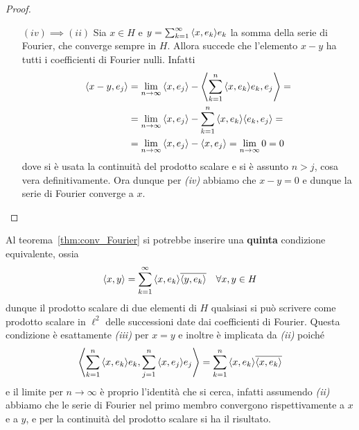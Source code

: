 \begin{proof}
\begin{enumerate}
    \item [\((iv) \implies (ii)\)] Sia \(x \in H\) e \(y = \sum_{k=1}^{\infty} {\left\langle x, e_{k}\right\rangle} e_{k} \)
    la somma della serie di Fourier, che converge sempre in \(H\). Allora
    succede che l'elemento \(x - y\) ha tutti i coefficienti di Fourier nulli.
    Infatti 
    \begin{align*}
        {\left\langle x - y, e_{j}\right\rangle} &= \lim_{n \to \infty} {\left\langle x, e_{j}\right\rangle} -
        {\left\langle\sum_{k=1}^{n} {\left\langle x, e_{k}\right\rangle} e_{k}, e_{j} \right\rangle} = \\ &= \lim_{n \to
        \infty}
      {\left\langle x, e_{j}\right\rangle} - \sum_{k=1}^{n} {\left\langle x, e_{k}\right\rangle} {\left\langle e_{k}, e_{j}\right\rangle} = \\
                            &= \lim_{n \to \infty} {\left\langle x, e_{j}\right\rangle} - {\left\langle x,
                            e_{j}\right\rangle} = \lim_{n \to \infty} 0 = 0
    \end{align*}
    dove si è usata la continuità del prodotto scalare e si è assunto \(n > j\),
    cosa vera definitivamente. Ora dunque per \textit{(iv)} abbiamo che \(x - y
    = 0\) e dunque la serie di Fourier converge a \(x\). 
    \end{enumerate}
\end{proof}
\begin{remark}
    Al teorema~\ref{thm:conv_Fourier} si potrebbe inserire una
    \textbf{quinta} condizione equivalente, ossia
    \[
        {\left\langle x, y\right\rangle} = \sum_{k=1}^{\infty} {\left\langle x, e_{k}\right\rangle} \overline{{\left\langle y,
        e_{k}\right\rangle}}  \quad \forall x, y \in H
    \]
    dunque il prodotto scalare di due elementi di \(H\) qualsiasi si può
    scrivere come prodotto scalare in \(\ell^2\) delle successioni date dai
    coefficienti di Fourier. Questa condizione è esattamente
    \textit{(iii)} per \(x = y\) e inoltre è implicata da \textit{(ii)} poiché
    \[
      {\left\langle\sum_{k=1}^{n} {\left\langle x, e_{k}\right\rangle} e_{k} , \sum_{j=1}^{n} {\left\langle x,
              e_{j}\right\rangle} e_{j} \right\rangle} = \sum_{k=1}^{n} {\left\langle x, e_{k}\right\rangle} \overline{{\left\langle x,
      e_{k}\right\rangle}}
    \]
    e il limite per \(n \to \infty\) è proprio l'identità che si cerca, infatti
    assumendo \textit{(ii)} abbiamo che le serie di Fourier nel primo membro
    convergono rispettivamente a \(x\) e a \(y\), e per la continuità del
    prodotto scalare si ha il risultato.
\end{remark}

